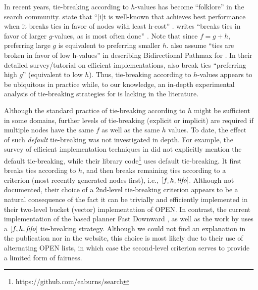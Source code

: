 In recent years, tie-breaking according to $h$-values has become ``folklore'' in the search community.
\citeauthor{hansen2007anytime} state that ``[i]t is well-known 
that \astar achieves best performance when it breaks ties
in favor of nodes with least h-cost'' \cite{hansen2007anytime}.
\citeauthor{holte2010common} writes ``\astar breaks ties in favor
of larger $g$-values, as is most often done'' \cite{holte2010common}.
Note that since $f=g+h$, preferring large $g$ is equivalent to preferring smaller $h$.
 also assume ``ties are broken in
favor of low h-values'' in describing Bidirectional Pathmax for \astar \citeyear{felner2011inconsistent}.
In their detailed survey/tutorial on efficient \astar implementations,
 \citeyear{burns2012implementing}
also break ties ``preferring high $g$'' (equivalent to low $h$).
Thus, tie-breaking according to $h$-values appears
to be ubiquitous in practice while,
to our knowledge, an in-depth experimental analysis of tie-breaking strategies for \astar is lacking in the literature.

Although the standard practice of tie-breaking according to $h$ might be
sufficient in some domains, further levels of tie-breaking (explicit or
implicit) are required if multiple nodes have the same $f$ as well as
the same $h$ values. To date, the effect of such \emph{default}
tie-breaking was not investigated in depth.
% 
For example, the survey of efficient \astar implementation techniques in
\cite{burns2012implementing} did not explicitly mention the default
tie-breaking, while their library
code\footnote{https://github.com/eaburns/search} uses \lifo
default tie-breaking.
% 
It first breaks ties according to $h$, and then
breaks remaining ties according to a \lifo criterion (most recently
generated nodes first), i.e., $[f,h,{\text{\textit{lifo}}}]$.
% 
Although not documented, their choice of a \lifo 2nd-level tie-breaking
criterion appears to be a natural consequence of the fact it can be
trivially and efficiently implemented in their two-level bucket (vector)
implementation of OPEN.
% 
In contrast, the current implementation of the \sota \astar based planner Fast
Downward \cite{Helmert2006}, as well as the work by \cite{RogerH10} uses
a $[f,h,{\text{\textit{fifo}}}]$ tie-breaking strategy.
% 
Although we could not find an explanation in the publication nor in the
website, this choice is most likely due to their use of alternating OPEN
lists, in which case the \fifo second-level criterion serves to provide a
limited form of fairness.
% 
